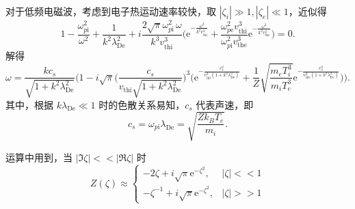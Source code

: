 \begin{example}
	对于低频电磁波，考虑到电子热运动速率较快，取 \(|\zeta_i|\gg1, |\zeta_e|\ll1\)，近似得
	\begin{equation*}
		1 - \frac{\omega_{p\mathrm{i}}^2}{\omega^2} + \frac{1}{k^2\lambda_{\mathrm{De}}^2} + i\frac{2\sqrt{\pi}\omega_{p\mathrm{i}}^2\,\omega}{k^3v_{\mathrm{thi}}^3}\bigg(\mathrm{e}^{-\frac{\omega^2}{k^2v_{\mathrm{thi}}^2}}+\frac{\omega_{p\mathrm{e}}^2v_{\mathrm{thi}}^3}{\omega_{p\mathrm{i}}^2v_{\mathrm{the}}^3}\mathrm{e}^{-\frac{\omega^2}{k^2v_{\mathrm{the}}^2}}\bigg) = 0.
	\end{equation*}
	解得
	\begin{equation*}
		\omega = \frac{k c_s}{\sqrt{1+k^2\lambda_{\mathrm{De}}^2}}\Bigg(1 - i\sqrt{\pi}\bigg(\frac{c_s}{v_{\mathrm{thi}}\sqrt{1+k^2\lambda_{\mathrm{De}}^2}}\bigg)^3\bigg(\mathrm{e}^{-\frac{c_s^2}{v_{\mathrm{thi}}^2\left(1+k^2\lambda_{\mathrm{De}}^2\right)}} + \frac{1}{Z}\sqrt{\frac{m_e T_i^3}{m_i T_e^3}}\mathrm{e}^{-\frac{c_s^2}{v_{\mathrm{the}}^2\left(1+k^2\lambda_{\mathrm{De}}^2\right)}}\bigg)\Bigg).
	\end{equation*}
	其中，根据 \(k\lambda_{\mathrm{De}}\ll1\) 时的色散关系易知，\(c_s\) 代表声速，即
	\begin{equation*}
		c_s = \omega_{p\mathrm{i}}\lambda_{\mathrm{De}} = \sqrt{\frac{Zk_B T_e}{m_i}}.
	\end{equation*}

	运算中用到，当 \(|\Im\zeta|<<|\Re\zeta|\) 时
	\begin{equation*}
		Z(\zeta)\approx
		\begin{cases}
			-2\zeta + i\sqrt{\pi}\mathrm{e}^{-\zeta^2},     & |\zeta|<<1 \\
			-\zeta^{-1} + i\sqrt{\pi}\mathrm{e}^{-\zeta^2}, & |\zeta|>>1
		\end{cases}
	\end{equation*}
\end{example}
